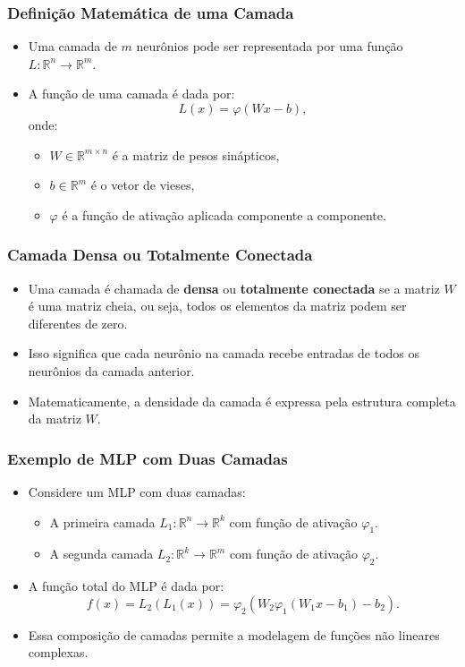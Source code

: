 \documentclass[aspectratio=169]{beamer}
\begin{document}
\begin{frame}
\frametitle{Definição Matemática de uma Camada}
\begin{itemize}
    \item Uma camada de \( m \) neurônios pode ser representada por uma função \( L: \mathbb{R}^n \to \mathbb{R}^m \).
    \item A função de uma camada é dada por:
    \[
    L(x) = \varphi(Wx - b),
    \]
    onde:
    \begin{itemize}
        \item \( W \in \mathbb{R}^{m \times n} \) é a matriz de pesos sinápticos,
        \item \( b \in \mathbb{R}^m \) é o vetor de vieses,
        \item \( \varphi \) é a função de ativação aplicada componente a componente.
    \end{itemize}
\end{itemize}
\end{frame}

\begin{frame}
\frametitle{Camada Densa ou Totalmente Conectada}
\begin{itemize}
    \item Uma camada é chamada de \textbf{densa} ou \textbf{totalmente conectada} se a matriz \( W \) é uma matriz cheia, ou seja, todos os elementos da matriz podem ser diferentes de zero.
    \item Isso significa que cada neurônio na camada recebe entradas de todos os neurônios da camada anterior.
    \item Matematicamente, a densidade da camada é expressa pela estrutura completa da matriz \( W \).
\end{itemize}
\end{frame}

\begin{frame}
\frametitle{Exemplo de MLP com Duas Camadas}
\begin{itemize}
    \item Considere um MLP com duas camadas:
    \begin{itemize}
        \item A primeira camada \( L_1: \mathbb{R}^n \to \mathbb{R}^k \) com função de ativação \( \varphi_1 \).
        \item A segunda camada \( L_2: \mathbb{R}^k \to \mathbb{R}^m \) com função de ativação \( \varphi_2 \).
    \end{itemize}
    \item A função total do MLP é dada por:
    \[
    f(x) = L_2(L_1(x)) = \varphi_2(W_2 \varphi_1(W_1 x - b_1) - b_2).
    \]
    \item Essa composição de camadas permite a modelagem de funções não lineares complexas.
\end{itemize}
\end{frame}
\end{document}
